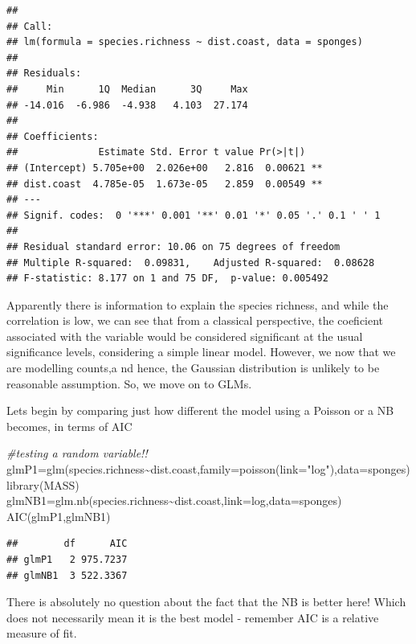 \documentclass[
]{book}
\newenvironment{Shaded}{\begin{snugshade}}{\end{snugshade}}
\newcommand{\AttributeTok}[1]{\textcolor[rgb]{0.77,0.63,0.00}{#1}}
\newcommand{\CommentTok}[1]{\textcolor[rgb]{0.56,0.35,0.01}{\textit{#1}}}
\newcommand{\FunctionTok}[1]{\textcolor[rgb]{0.00,0.00,0.00}{#1}}
\newcommand{\NormalTok}[1]{#1}
\newcommand{\OtherTok}[1]{\textcolor[rgb]{0.56,0.35,0.01}{#1}}
\newcommand{\SpecialCharTok}[1]{\textcolor[rgb]{0.00,0.00,0.00}{#1}}
\newcommand{\StringTok}[1]{\textcolor[rgb]{0.31,0.60,0.02}{#1}}
\begin{document}
\begin{verbatim}
## 
## Call:
## lm(formula = species.richness ~ dist.coast, data = sponges)
## 
## Residuals:
##     Min      1Q  Median      3Q     Max 
## -14.016  -6.986  -4.938   4.103  27.174 
## 
## Coefficients:
##              Estimate Std. Error t value Pr(>|t|)   
## (Intercept) 5.705e+00  2.026e+00   2.816  0.00621 **
## dist.coast  4.785e-05  1.673e-05   2.859  0.00549 **
## ---
## Signif. codes:  0 '***' 0.001 '**' 0.01 '*' 0.05 '.' 0.1 ' ' 1
## 
## Residual standard error: 10.06 on 75 degrees of freedom
## Multiple R-squared:  0.09831,    Adjusted R-squared:  0.08628 
## F-statistic: 8.177 on 1 and 75 DF,  p-value: 0.005492
\end{verbatim}

Apparently there is information to explain the species richness, and while the correlation is low, we can see that from a classical perspective, the coeficient associated with the variable would be considered significant at the usual significance levels, considering a simple linear model. However, we now that we are modelling counts,a nd hence, the Gaussian distribution is unlikely to be reasonable assumption. So, we move on to GLMs.

Lets begin by comparing just how different the model using a Poisson or a NB becomes, in terms of AIC

\begin{Shaded}
\begin{Highlighting}[]
\CommentTok{\#testing a random variable!!}
\NormalTok{glmP1}\OtherTok{=}\FunctionTok{glm}\NormalTok{(species.richness}\SpecialCharTok{\textasciitilde{}}\NormalTok{dist.coast,}\AttributeTok{family=}\FunctionTok{poisson}\NormalTok{(}\AttributeTok{link=}\StringTok{"log"}\NormalTok{),}\AttributeTok{data=}\NormalTok{sponges)}
\FunctionTok{library}\NormalTok{(MASS)}
\NormalTok{glmNB1}\OtherTok{=}\FunctionTok{glm.nb}\NormalTok{(species.richness}\SpecialCharTok{\textasciitilde{}}\NormalTok{dist.coast,}\AttributeTok{link=}\NormalTok{log,}\AttributeTok{data=}\NormalTok{sponges)}
\FunctionTok{AIC}\NormalTok{(glmP1,glmNB1)}
\end{Highlighting}
\end{Shaded}

\begin{verbatim}
##        df      AIC
## glmP1   2 975.7237
## glmNB1  3 522.3367
\end{verbatim}

There is absolutely no question about the fact that the NB is better here! Which does not necessarily mean it is the best model - remember AIC is a relative measure of fit.
\end{document}
